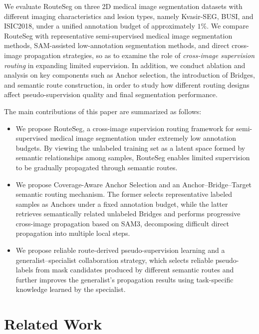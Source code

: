 \documentclass[a4paper,fleqn]{cas-dc}
\begin{document}
We evaluate RouteSeg on three 2D medical image segmentation datasets with different imaging characteristics and lesion types, namely Kvasir-SEG, BUSI, and ISIC2018, under a unified annotation budget of approximately \(1\%\). We compare RouteSeg with representative semi-supervised medical image segmentation methods, SAM-assisted low-annotation segmentation methods, and direct cross-image propagation strategies, so as to examine the role of \emph{cross-image supervision routing} in expanding limited supervision. In addition, we conduct ablation and analysis on key components such as Anchor selection, the introduction of Bridges, and semantic route construction, in order to study how different routing designs affect pseudo-supervision quality and final segmentation performance.

The main contributions of this paper are summarized as follows:

\begin{itemize}
    \item We propose RouteSeg, a cross-image supervision routing framework for semi-supervised medical image segmentation under extremely low annotation budgets. By viewing the unlabeled training set as a latent space formed by semantic relationships among samples, RouteSeg enables limited supervision to be gradually propagated through semantic routes.
    
    \item We propose Coverage-Aware Anchor Selection and an Anchor--Bridge--Target semantic routing mechanism. The former selects representative labeled samples as Anchors under a fixed annotation budget, while the latter retrieves semantically related unlabeled Bridges and performs progressive cross-image propagation based on SAM3, decomposing difficult direct propagation into multiple local steps.
    
    \item We propose reliable route-derived pseudo-supervision learning and a generalist--specialist collaboration strategy, which selects reliable pseudo-labels from mask candidates produced by different semantic routes and further improves the generalist's propagation results using task-specific knowledge learned by the specialist.
\end{itemize}


\section{Related Work}
\end{document}
